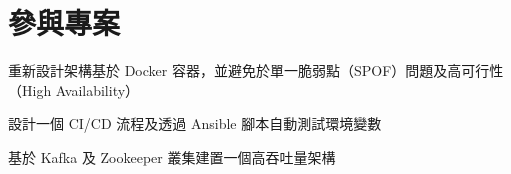 \documentclass[]{deedy-resume-openfont-ch}
\begin{document}
\begin{minipage}[t]{0.45\textwidth}
\section{參與專案}

\vspace{\topsep} %
\begin{tightemize}
    \item 重新設計架構基於 Docker 容器，並避免於單一脆弱點（SPOF）問題及高可行性（High Availability）
    \item 設計一個 CI/CD 流程及透過 Ansible 腳本自動測試環境變數
    \item 基於 Kafka 及 Zookeeper 叢集建置一個高吞吐量架構
\end{tightemize}
\sectionsep


%
%

\end{minipage}
\hfill
\end{document}
